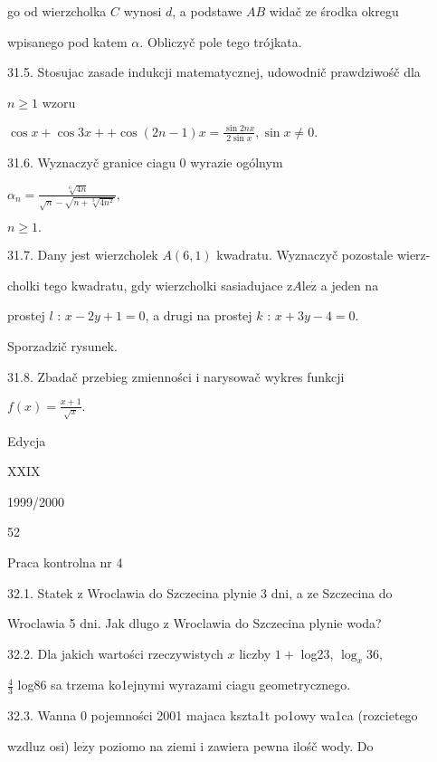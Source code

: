 \documentclass[a4paper,12pt]{article}
\begin{document}
go od wierzcholka $C$ wynosi $d$, a podstawe $AB$ widač ze środka okregu

wpisanego pod katem $\alpha$. Obliczyč pole tego trójkata.

31.5. Stosujac zasade indukcji matematycznej, udowodnič prawdziwośč dla

$n\geq 1$ wzoru

$\displaystyle \cos x+\cos 3x++\cos(2n-1)x=\frac{\sin 2nx}{2\sin x},\sin x\neq 0.$

31.6. Wyznaczyč granice ciagu $0$ wyrazie ogólnym

$\displaystyle \alpha_{n}=\frac{\sqrt[6]{4n}}{\sqrt{n}-\sqrt{n+\sqrt[3]{4n^{2}}}},$

$n\geq 1.$

31.7. Dany jest wierzcholek $A(6,1)$ kwadratu. Wyznaczyč pozostale wierz-

cholki tego kwadratu, gdy wierzcholki sasiadujace $\mathrm{z}A\mathrm{l}\mathrm{e}\dot{\mathrm{z}}$ a jeden na

prostej $l$ : $x-2y+1 = 0$, a drugi na prostej $k$ : $x+3y-4 = 0.$

Sporzadzič rysunek.

31.8. Zbadač przebieg zmienności $\mathrm{i}$ narysowač wykres funkcji

$f(x)=\displaystyle \frac{x+1}{\sqrt{x}}.$





Edycja

XXIX

1999/2000





52

Praca kontrolna nr 4

32.1. Statek $\mathrm{z}$ Wroclawia do Szczecina plynie 3 $\mathrm{d}\mathrm{n}\mathrm{i}$, a ze Szczecina do

Wroclawia 5 $\mathrm{d}\mathrm{n}\mathrm{i}$. Jak dlugo $\mathrm{z}$ Wroclawia do Szczecina plynie woda?

32.2. Dla jakich wartości rzeczywistych $x$ liczby $1 +$ log23, $\log_{x}36,$

$\displaystyle \frac{4}{3}$ log86 sa trzema ko1ejnymi wyrazami ciagu geometrycznego.

32.3. Wanna $0$ pojemności 2001 majaca kszta1t po1owy wa1ca (rozcietego

wzdluz osi) $\mathrm{l}\mathrm{e}\dot{\mathrm{z}}\mathrm{y}$ poziomo na ziemi $\mathrm{i}$ zawiera pewna ilośč wody. Do
\end{document}
